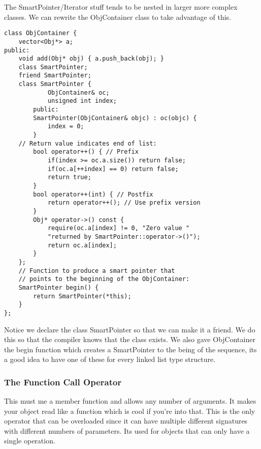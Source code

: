 \documentclass[12pt]{article}
\begin{document}
The SmartPointer/Iterator stuff tends to be nested in larger more complex classes. We can rewrite the ObjContainer class to take advantage of this.
\begin{lstlisting}
class ObjContainer {
    vector<Obj*> a;
public:
    void add(Obj* obj) { a.push_back(obj); }
    class SmartPointer;
    friend SmartPointer;
    class SmartPointer {
            ObjContainer& oc;
            unsigned int index;
        public:
        SmartPointer(ObjContainer& objc) : oc(objc) {
            index = 0;
        }
    // Return value indicates end of list:
        bool operator++() { // Prefix
            if(index >= oc.a.size()) return false;
            if(oc.a[++index] == 0) return false;
            return true;
        }
        bool operator++(int) { // Postfix
            return operator++(); // Use prefix version
        }
        Obj* operator->() const {
            require(oc.a[index] != 0, "Zero value "
            "returned by SmartPointer::operator->()");
            return oc.a[index];
        }
    };
    // Function to produce a smart pointer that
    // points to the beginning of the ObjContainer:
    SmartPointer begin() {
        return SmartPointer(*this);
    }
};
\end{lstlisting}
Notice we declare the class SmartPointer so that we can make it a friend. We do this so that the compiler knows that the class exists. We also gave ObjContainer the begin function which creates a SmartPointer to the being of the sequence, its a good idea to have one of these for every linked list type structure.

\subsubsection*{The Function Call Operator}
This must me a member function and allows any number of arguments. It makes your object read like a function which is cool if you're into that. This is the only operator that can be overloaded since it can have multiple different signatures with different numbers of parameters. Its used for objects that can only have a single operation.
\end{document}
